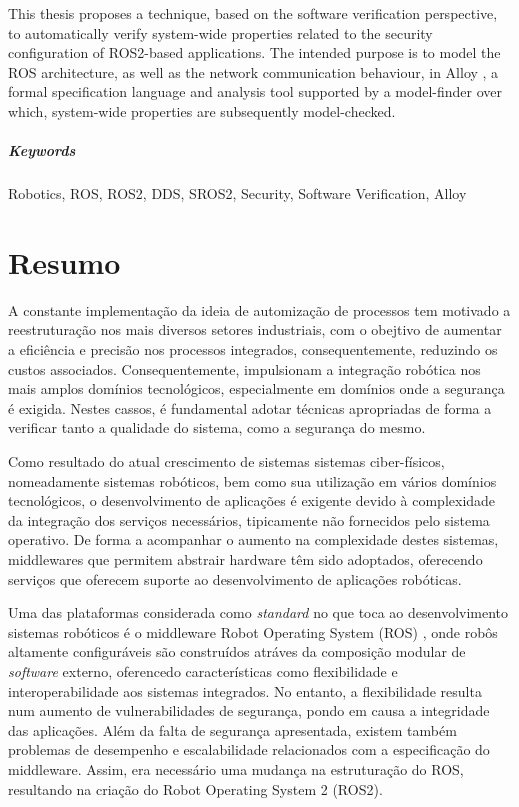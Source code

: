 \documentclass[
  oneside,
  11pt, a4paper,
  footinclude=true,
  headinclude=true,
  cleardoublepage=empty
]{scrbook}
\begin{document}
	This thesis proposes a technique, based on the software verification perspective, to automatically verify system-wide properties related to the security configuration of ROS2-based applications. The intended purpose is to model the ROS architecture, as well as the network communication behaviour, in Alloy \cite{alloy-DJ}, a formal specification language and analysis tool supported by a model-finder over which, system-wide properties are subsequently model-checked.

\paragraph{Keywords} Robotics, ROS, ROS2, DDS, SROS2, Security, Software Verification, Alloy
	\cleardoublepage

\chapter*{Resumo}

	A constante implementação da ideia de automização de processos tem motivado a reestruturação nos mais diversos setores industriais, com o obejtivo de aumentar a eficiência e precisão nos processos integrados, consequentemente, reduzindo os custos associados. Consequentemente, impulsionam a integração robótica nos mais amplos domínios tecnológicos, especialmente em domínios onde a segurança é exigida. Nestes cassos, é fundamental adotar técnicas apropriadas de forma a verificar tanto a qualidade do sistema, como a segurança do mesmo.

	Como resultado do atual crescimento de sistemas sistemas ciber-físicos, nomeadamente sistemas robóticos, bem como sua utilização em vários domínios tecnológicos, o desenvolvimento de aplicações é exigente devido à complexidade da integração dos serviços necessários, tipicamente não fornecidos pelo sistema operativo. De forma a acompanhar o aumento na complexidade destes sistemas, middlewares que permitem abstrair hardware têm sido adoptados, oferecendo serviços que oferecem suporte ao desenvolvimento de aplicações robóticas.

	Uma das plataformas considerada como \textit{standard} no que toca ao desenvolvimento sistemas robóticos é o middleware Robot Operating System (ROS) \cite{1}, onde robôs altamente configuráveis são construídos atráves da composição modular de \textit{software} externo, oferencedo características como flexibilidade e interoperabilidade aos sistemas integrados. No entanto, a flexibilidade resulta num aumento de vulnerabilidades de segurança, pondo em causa a integridade das aplicações. Além da falta de segurança apresentada, existem também problemas de desempenho e escalabilidade relacionados com a especificação do middleware. Assim, era necessário uma mudança na estruturação do ROS, resultando na criação do Robot Operating System 2 (ROS2).
\end{document}
